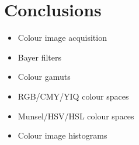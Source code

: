 \documentclass{article}
\begin{document}
\section{Conclusions}
\begin{itemize}
	\item Colour image acquisition
	\item Bayer filters
	\item Colour gamuts
	\item RGB/CMY/YIQ colour spaces
	\item Munsel/HSV/HSL colour spaces
	\item Colour image histograms
\end{itemize}
\end{document}
